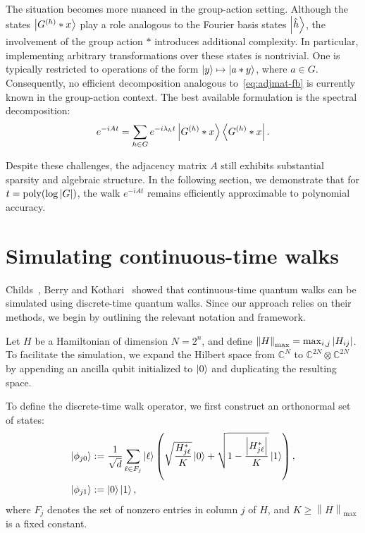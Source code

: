 \documentclass[12pt]{report}
\newcommand{\opnorm}[1]{\left\lVert #1 \right\rVert}
\begin{document}
The situation becomes more nuanced in the group-action setting. Although the states \( \ket{G^{(h)} * x} \) play a role analogous to the Fourier basis states \( \ket{\hat{h}} \), the involvement of the group action \( * \) introduces additional complexity. In particular, implementing arbitrary transformations over these states is nontrivial. One is typically restricted to operations of the form \( \ket{y} \mapsto \ket{a * y} \), where \( a \in G \). Consequently, no efficient decomposition analogous to~\eqref{eq:adjmat-fb} is currently known in the group-action context. The best available formulation is the spectral decomposition:
\[
e^{-iAt} = \sum_{h \in G} e^{-i\lambda_h t} \ket{G^{(h)} * x} \bra{G^{(h)} * x}.
\]

Despite these challenges, the adjacency matrix \( A \) still exhibits substantial sparsity and algebraic structure. In the following section, we demonstrate that for \( t = \operatorname{poly}(\log \abs{G}) \), the walk \( e^{-iAt} \) remains efficiently approximable to polynomial accuracy.




\section{Simulating continuous-time walks}
Childs~\cite{Childs2004}, Berry and Kothari~\cite{BerryKothari} showed that continuous-time quantum walks can be simulated using discrete-time quantum walks. Since our approach relies on their methods, we begin by outlining the relevant notation and framework.

Let \( H \) be a Hamiltonian of dimension \( N = 2^n \), and define \( \opnorm{H}_{\mathrm{max}} = \max_{i, j} \abs{H_{ij}} \). To facilitate the simulation, we expand the Hilbert space from \( \mathbb{C}^N \) to \( \mathbb{C}^{2N} \otimes \mathbb{C}^{2N} \) by appending an ancilla qubit initialized to \( \ket{0} \) and duplicating the resulting space.

To define the discrete-time walk operator, we first construct an orthonormal set of states:
\begin{align}
    \ket{\phi_{j0}} & := \frac{1}{\sqrt{d}} \sum_{\ell \in F_j} \ket{\ell} \left( \sqrt{\frac{H_{j\ell}^*}{K}} \ket{0} + \sqrt{1 - \frac{\abs{H_{j\ell}^*}}{K}} \ket{1} \right), \label{eq:walk-sim} \\
    \ket{\phi_{j1}} & := \ket{0} \ket{1}, \nonumber
\end{align}
where \( F_j \) denotes the set of nonzero entries in column \( j \) of \( H \), and \( K \ge \opnorm{H}_{\mathrm{max}} \) is a fixed constant.
\end{document}

